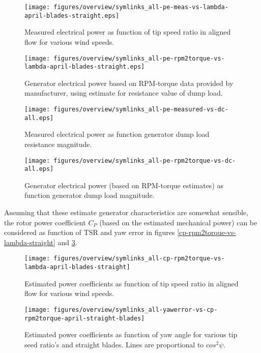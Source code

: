 \documentclass[a4paper]{jpconf}
\begin{document}
\begin{figure}[h]
\begin{minipage}{17pc}
\texttt{[image: figures/overview/symlinks\_all-pe-meas-vs-lambda-april-blades-straight.eps]}
\caption{\label{pe-meas-vs-lambda} Measured electrical power as function of tip speed ratio in aligned flow for various wind speeds.}
\vspace{10px}
\end{minipage}\hspace{2pc}%
\begin{minipage}{17pc}
\texttt{[image: figures/overview/symlinks\_all-pe-rpm2torque-vs-lambda-april-blades-straight.eps]}
\caption{\label{pe-rpm2torque-vs-lambda} Generator electrical power based on RPM-torque data provided by manufacturer, using estimate for resistance value of dump load.}
\end{minipage} 
\end{figure}


\begin{figure}[h]
\begin{minipage}{17pc}
\texttt{[image: figures/overview/symlinks\_all-pe-measured-vs-dc-all.eps]}
\caption{\label{pe-meas-vs-dc} Measured electrical power as function generator dump load resistance magnitude.}
\vspace{10px}
\end{minipage}\hspace{2pc}%
\begin{minipage}{17pc}
\texttt{[image: figures/overview/symlinks\_all-pe-rpm2torque-vs-dc-all.eps]}
\caption{\label{pe-rpm2torque-vs-dc} Generator electrical power (based on RPM-torque estimates) as function generator dump load magnitude.}
\end{minipage} 
\end{figure}


Assuming that these estimate generator characteristics are somewhat sensible, the rotor power coefficient $C_P$ (based on the estimated mechanical power) can be considered as function of TSR and yaw error in figures \ref{cp-rpm2torque-vs-lambda-straight} and \ref{cp-rpm2torque-vs-yawerror-straight}.


\begin{figure}[h]
\begin{minipage}{17pc}
\texttt{[image: figures/overview/symlinks\_all-cp-rpm2torque-vs-lambda-april-blades-straight]}
\caption{\label{cp-rpm2torque-vs-lambda-straight} Estimated power coefficients as function of tip speed ratio in aligned flow for various wind speeds.}
\vspace{10px}
\end{minipage}\hspace{2pc}%
\begin{minipage}{17pc}
\texttt{[image: figures/overview/symlinks\_all-yawerror-vs-cp-rpm2torque-april-straight-blades]}
\caption{\label{cp-rpm2torque-vs-yawerror-straight} Estimated power coefficients as function of yaw angle for various tip seed ratio's and straight blades. Lines are proportional to $cos^2 \psi$.}
\end{minipage} 
\end{figure}
\end{document}
